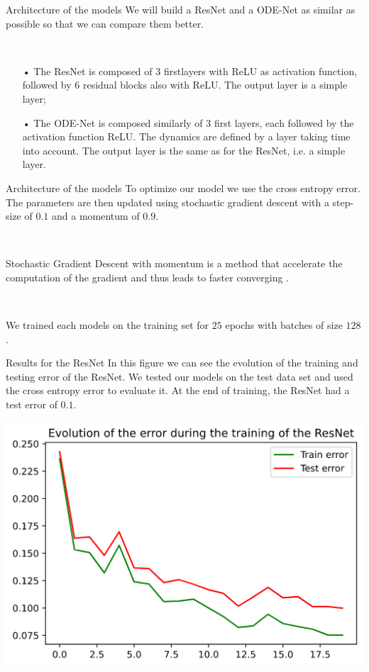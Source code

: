 \documentclass[11pt]{beamer}
\begin{document}
\begin{frame}{Architecture of the models}
We will build a ResNet and a ODE-Net as similar as possible so that we can compare them better.

~

\begin{itemize}
\item[•] The ResNet is composed of $3$ firstlayers with ReLU as activation function, followed by $6$ residual blocks also with ReLU. The output layer is a simple layer;
\item[•] The ODE-Net is composed similarly of $3$ first layers, each followed by the activation function ReLU. The dynamics are defined by a layer taking time into account. The output layer is the same as for the ResNet, i.e. a simple layer.
\end{itemize}
\end{frame}

\begin{frame}{Architecture of the models}
To optimize our model we use the cross entropy error. The parameters are then updated using stochastic gradient descent with a step-size of $0.1$ and a momentum of $0.9$. 

~

Stochastic Gradient Descent with momentum is a method that accelerate the computation of the gradient and thus leads to faster converging \cite{8}.

~

We trained each models on the training set for $25$ epochs with batches of size $128$. 
\end{frame}

\begin{frame}{Results for the ResNet}
In this figure we can see the evolution of the training and testing error of the ResNet. We tested our models on the test data set and used the cross entropy error to evaluate it. At the end of training, the ResNet had a test error of $0.1$.
\begin{center}
\includegraphics[scale=0.4]{resnet_rd_loss.png}
\end{center}

\end{frame}
\end{document}
